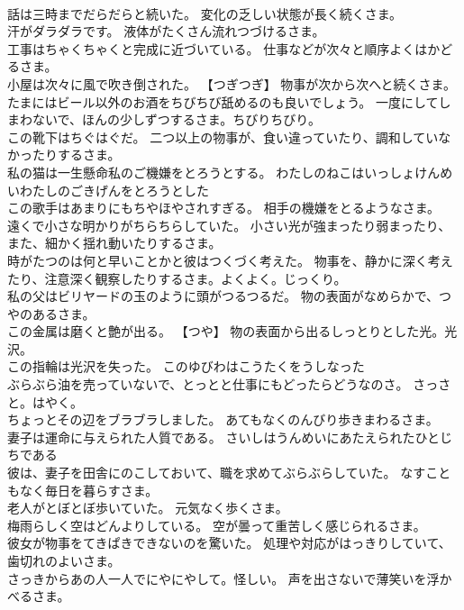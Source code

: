 \documentclass[8pt]{extreport}
\begin{document}
\begin{CJK}{UTF8}{min}
\\	話は三時までだらだらと続いた。	変化の乏しい状態が長く続くさま。
\\	汗がダラダラです。	液体がたくさん流れつづけるさま。
\\	工事はちゃくちゃくと完成に近づいている。	仕事などが次々と順序よくはかどるさま。
\\	小屋は次々に風で吹き倒された。	【つぎつぎ】 物事が次から次へと続くさま。
\\	たまにはビール以外のお酒をちびちび舐めるのも良いでしょう。	一度にしてしまわないで、ほんの少しずつするさま。ちびりちびり。
\\	この靴下はちぐはぐだ。	二つ以上の物事が、食い違っていたり、調和していなかったりするさま。
\\	私の猫は一生懸命私のご機嫌をとろうとする。	わたしのねこはいっしょけんめいわたしのごきげんをとろうとした 
\\	この歌手はあまりにもちやほやされすぎる。	相手の機嫌をとるようなさま。
\\	遠くで小さな明かりがちらちらしていた。	小さい光が強まったり弱まったり、また、細かく揺れ動いたりするさま。
\\	時がたつのは何と早いことかと彼はつくづく考えた。	物事を、静かに深く考えたり、注意深く観察したりするさま。よくよく。じっくり。
\\	私の父はビリヤードの玉のように頭がつるつるだ。	物の表面がなめらかで、つやのあるさま。
\\	この金属は磨くと艶が出る。	【つや】 物の表面から出るしっとりとした光。光沢。
\\	この指輪は光沢を失った。	このゆびわはこうたくをうしなった 
\\	ぶらぶら油を売っていないで、とっとと仕事にもどったらどうなのさ。	さっさと。はやく。
\\	ちょっとその辺をブラブラしました。	あてもなくのんびり歩きまわるさま。
\\	妻子は運命に与えられた人質である。	さいしはうんめいにあたえられたひとじちである 
\\	彼は、妻子を田舎にのこしておいて、職を求めてぶらぶらしていた。	なすこともなく毎日を暮らすさま。
\\	老人がとぼとぼ歩いていた。	元気なく歩くさま。
\\	梅雨らしく空はどんよりしている。	空が曇って重苦しく感じられるさま。
\\	彼女が物事をてきぱきできないのを驚いた。	処理や対応がはっきりしていて、歯切れのよいさま。
\\	さっきからあの人一人でにやにやして。怪しい。	声を出さないで薄笑いを浮かべるさま。

\end{CJK}
\end{document}
